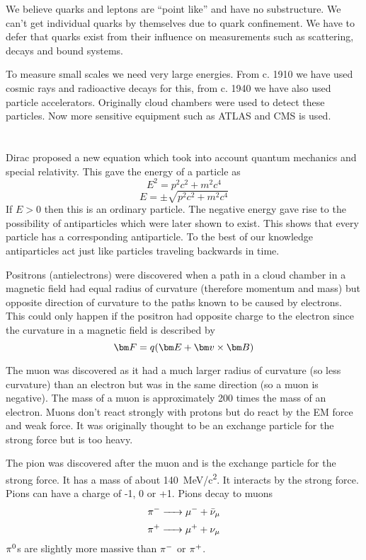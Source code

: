 We believe quarks and leptons are ``point like'' and have no substructure. We can't get individual quarks by themselves due to quark confinement. We have to defer that quarks exist from their influence on measurements such as scattering, decays and bound systems.

To measure small scales we need very large energies. From c. 1910 we have used cosmic rays and radioactive decays for this, from c. 1940 we have also used particle accelerators. Originally cloud chambers were used to detect these particles. Now more sensitive equipment such as ATLAS and CMS is used.

\section{}

Dirac proposed a new equation which took into account quantum mechanics and special relativity. This gave the energy of a particle as
\[E^2=p^2c^2+m^2c^4\]
\[E=\pm\sqrt{p^2c^2+m^2c^4}\]
If \(E>0\) then this is an ordinary particle. The negative energy gave rise to the possibility of antiparticles which were later shown to exist. This shows that every particle has a corresponding antiparticle. To the best of our knowledge antiparticles act just like particles traveling backwards in time.

Positrons (antielectrons) were discovered when a path in a cloud chamber in a magnetic field had equal radius of curvature (therefore momentum and mass) but opposite direction of curvature to the paths known to be caused by electrons. This could only happen if the positron had opposite charge to the electron since the curvature in a magnetic field is described by
\[\vv F=q(\vv E+\vv v\times\vv B)\]

The muon was discovered as it had a much larger radius of curvature (so less curvature) than an electron but was in the same direction (so a muon is negative). The mass of a muon is approximately 200 times the mass of an electron. Muons don't react strongly with protons but do react by the EM force and weak force. It was originally thought to be an exchange particle for the strong force but is too heavy.

The pion was discovered after the muon and is the exchange particle for the strong force. It has a mass of about \SI{140}{MeV/c^2}. It interacts by the strong force. Pions can have a charge of -1, 0 or +1. Pions decay to muons
\[\piminus\ce{->}\muonm+\antineutrino[\mu]\]
\[\piplus\ce{->}\muonp+\neutrino[\mu]\]
\(\pi^0\)s are slightly more massive than \(\pi^-\) or \(\pi^+\).

